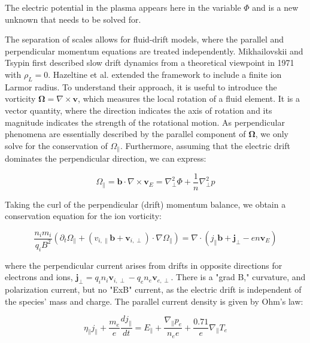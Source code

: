 The electric potential in the plasma appears here in the variable $\Phi$ and is a new unknown that needs to be solved for.






The separation of scales allows for fluid-drift models, where the parallel and perpendicular momentum equations are treated independently. Mikhailovskii and Tsypin\cite{mikhailovskii1971transport} first described slow drift dynamics from a theoretical viewpoint in 1971 with $\rho_L = 0$. Hazeltine et al.\cite{hazeltine1985four} extended the framework to include a finite ion Larmor radius. To understand their approach, it is useful to introduce the vorticity $ \boldsymbol{\Omega} = \nabla \times \mathbf{v}$, which measures the local rotation of a fluid element. It is a vector quantity, where the direction indicates the axis of rotation and its magnitude indicates the strength of the rotational motion. As perpendicular phenomena are essentially described by the parallel component of $\boldsymbol{\Omega}$, we only solve for the conservation of $\Omega_\parallel$. Furthermore, assuming that the electric drift dominates the perpendicular direction, we can express:

\begin{equation}
	\Omega_\parallel = \mathbf{b} \cdot \nabla \times \mathbf{v}_E = \nabla_\perp^2 \Phi + \frac{1}{n}\nabla_\perp^2 p
\end{equation}

Taking the curl of the perpendicular (drift) momentum balance, we obtain a conservation equation for the ion vorticity:

\begin{equation}
	\label{eq:edge_vorticityConservation}
	\frac{n_im_i}{q_iB^2}\left(\partial_t\Omega_\parallel + (v_{i,\parallel}\mathbf{b} + \mathbf{v}_{i,\perp})\cdot\nabla\Omega_\parallel\right) = \nabla \cdot \left(j_\parallel\mathbf{b} + \mathbf{j}_\perp - en\mathbf{v}_E\right)
\end{equation}

where the perpendicular current arises from drifts in opposite directions for electrons and ions, $\mathbf{j}_\perp = q_i n_i \mathbf{v}_{i,\perp} - q_e n_e \mathbf{v}_{e,\perp}$. There is a "grad B," curvature, and polarization current, but no "ExB" current, as the electric drift is independent of the species' mass and charge. The parallel current density is given by Ohm's law:

\begin{equation}
	\eta_\parallel j_\parallel + \frac{m_e}{e}\frac{dj_\parallel}{dt} = E_\parallel + \frac{\nabla_\parallel p_e}{n_e e} + \frac{0.71}{e}\nabla_\parallel T_e
\end{equation}

